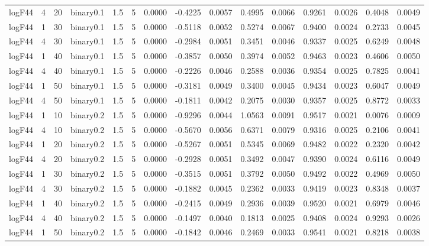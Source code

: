 \begin{longtable}{rrrrrrrrrrrrrrr}
  logF44 & 4 & 20 & binary0.1 & 1.5 & 5 & 0.0000 & -0.4225 & 0.0057 & 0.4995 & 0.0066 & 0.9261 & 0.0026 & 0.4048 & 0.0049 \\ 
  logF44 & 1 & 30 & binary0.1 & 1.5 & 5 & 0.0000 & -0.5118 & 0.0052 & 0.5274 & 0.0067 & 0.9400 & 0.0024 & 0.2733 & 0.0045 \\ 
  logF44 & 4 & 30 & binary0.1 & 1.5 & 5 & 0.0000 & -0.2984 & 0.0051 & 0.3451 & 0.0046 & 0.9337 & 0.0025 & 0.6249 & 0.0048 \\ 
  logF44 & 1 & 40 & binary0.1 & 1.5 & 5 & 0.0000 & -0.3857 & 0.0050 & 0.3974 & 0.0052 & 0.9463 & 0.0023 & 0.4606 & 0.0050 \\ 
  logF44 & 4 & 40 & binary0.1 & 1.5 & 5 & 0.0000 & -0.2226 & 0.0046 & 0.2588 & 0.0036 & 0.9354 & 0.0025 & 0.7825 & 0.0041 \\ 
  logF44 & 1 & 50 & binary0.1 & 1.5 & 5 & 0.0000 & -0.3181 & 0.0049 & 0.3400 & 0.0045 & 0.9434 & 0.0023 & 0.6047 & 0.0049 \\ 
  logF44 & 4 & 50 & binary0.1 & 1.5 & 5 & 0.0000 & -0.1811 & 0.0042 & 0.2075 & 0.0030 & 0.9357 & 0.0025 & 0.8772 & 0.0033 \\ 
  logF44 & 1 & 10 & binary0.2 & 1.5 & 5 & 0.0000 & -0.9296 & 0.0044 & 1.0563 & 0.0091 & 0.9517 & 0.0021 & 0.0076 & 0.0009 \\ 
  logF44 & 4 & 10 & binary0.2 & 1.5 & 5 & 0.0000 & -0.5670 & 0.0056 & 0.6371 & 0.0079 & 0.9316 & 0.0025 & 0.2106 & 0.0041 \\ 
  logF44 & 1 & 20 & binary0.2 & 1.5 & 5 & 0.0000 & -0.5267 & 0.0051 & 0.5345 & 0.0069 & 0.9482 & 0.0022 & 0.2320 & 0.0042 \\ 
  logF44 & 4 & 20 & binary0.2 & 1.5 & 5 & 0.0000 & -0.2928 & 0.0051 & 0.3492 & 0.0047 & 0.9390 & 0.0024 & 0.6116 & 0.0049 \\ 
  logF44 & 1 & 30 & binary0.2 & 1.5 & 5 & 0.0000 & -0.3515 & 0.0051 & 0.3792 & 0.0050 & 0.9492 & 0.0022 & 0.4969 & 0.0050 \\ 
  logF44 & 4 & 30 & binary0.2 & 1.5 & 5 & 0.0000 & -0.1882 & 0.0045 & 0.2362 & 0.0033 & 0.9419 & 0.0023 & 0.8348 & 0.0037 \\ 
  logF44 & 1 & 40 & binary0.2 & 1.5 & 5 & 0.0000 & -0.2415 & 0.0049 & 0.2936 & 0.0039 & 0.9520 & 0.0021 & 0.6979 & 0.0046 \\ 
  logF44 & 4 & 40 & binary0.2 & 1.5 & 5 & 0.0000 & -0.1497 & 0.0040 & 0.1813 & 0.0025 & 0.9408 & 0.0024 & 0.9293 & 0.0026 \\ 
  logF44 & 1 & 50 & binary0.2 & 1.5 & 5 & 0.0000 & -0.1842 & 0.0046 & 0.2469 & 0.0033 & 0.9541 & 0.0021 & 0.8218 & 0.0038 \\ 

\end{longtable}
